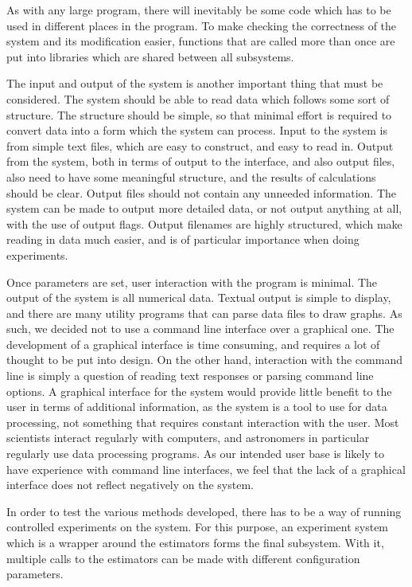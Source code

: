 \documentclass[a4paper,11pt,twoside]{article}
\begin{document}
   As with any large program, there will inevitably be some code which has to be
   used in different places in the program. To make checking the correctness of
   the system and its modification easier, functions that are called more than
   once are put into libraries which are shared between all subsystems.

   The input and output of the system is another important thing that must be
   considered. The system should be able to read data which follows some sort of
   structure. The structure should be simple, so that minimal effort is required
   to convert data into a form which the system can process. Input to the system
   is from simple text files, which are easy to construct, and easy to read
   in. Output from the system, both in terms of output to the interface, and
   also output files, also need to have some meaningful structure, and the
   results of calculations should be clear. Output files should not contain any
   unneeded information. The system can be made to output more detailed data, or
   not output anything at all, with the use of output flags. Output filenames
   are highly structured, which make reading in data much easier, and is of
   particular importance when doing experiments.

   Once parameters are set, user interaction with the program is minimal. The
   output of the system is all numerical data. Textual output is simple to
   display, and there are many utility programs that can parse data files to
   draw graphs. As such, we decided not to use a command line interface over a
   graphical one. The development of a graphical interface is time consuming,
   and requires a lot of thought to be put into design. On the other hand,
   interaction with the command line is simply a question of reading text
   responses or parsing command line options. A graphical interface for the
   system would provide little benefit to the user in terms of additional
   information, as the system is a tool to use for data processing, not
   something that requires constant interaction with the user. Most scientists
   interact regularly with computers, and astronomers in particular regularly
   use data processing programs. As our intended user base is likely to have
   experience with command line interfaces, we feel that the lack of a graphical
   interface does not reflect negatively on the system.

   In order to test the various methods developed, there has to be a way of
   running controlled experiments on the system. For this purpose, an experiment
   system which is a wrapper around the estimators forms the final
   subsystem. With it, multiple calls to the estimators can be made with
   different configuration parameters.
\end{document}

